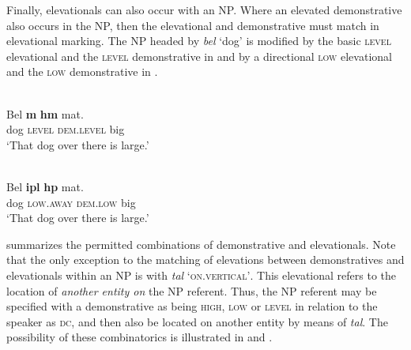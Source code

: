 Finally, elevationals can also occur with an NP. Where an elevated demonstrative also occurs in the NP, then the elevational and demonstrative must match in elevational marking. The NP headed by \textit{bel} `dog' is modified by the basic \textsc{level} elevational and the \textsc{level} demonstrative in  and by a directional \textsc{low} elevational and the \textsc{low} demonstrative in .  



\ea%
\label{ex:7:26}
 \\
\gll Bel  \textbf{m{\textopeno}{\ng}}  \textbf{h{\textepsilon}m{\textopeno}} mat{\textepsilon}.  \\
  dog  \textsc{level} \textsc{dem.level} big      \\
\glt   `That dog over there is large.'
\z

 
 





\ea%
\label{ex:7:27}
 \\
\gll   Bel  \textbf{ipl{\textepsilon}} \textbf{h{\textepsilon}p{\textopeno}} mat{\textepsilon}. \\
    dog  \textsc{low.away} \textsc{dem.low} big    \\
\glt   `That dog over there is large.'
\z



   



 summarizes the permitted combinations of demonstrative and elevationals. Note that the only exception to the matching of elevations between demonstratives and elevationals within an NP is with \textit{tal}\textit{{\textepsilon}} `\textsc{on.vertical'}. This elevational refers to the location of \textit{another entity on} the NP referent. Thus, the NP referent may be specified with a demonstrative as being \textsc{high}, \textsc{low} or \textsc{level} in relation to the speaker as \textsc{dc}, and then also be located on another entity by means of \textit{tal}\textit{{\textepsilon}}. The possibility of these combinatorics is illustrated in  and .

